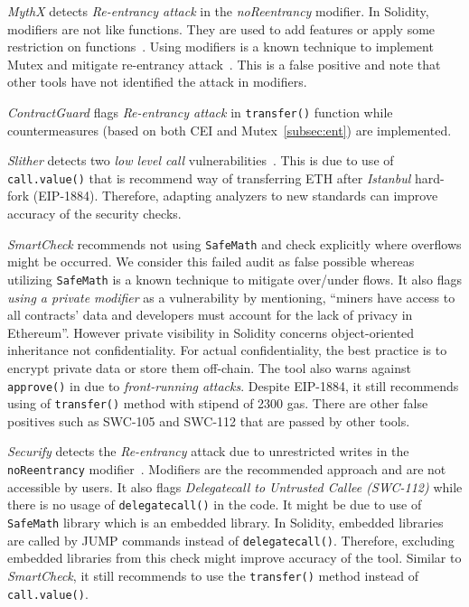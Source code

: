\textit{MythX} detects \textit{Re-entrancy attack} in the \textit{noReentrancy} modifier. In Solidity, modifiers are not like functions. They are used to add features or apply some restriction on functions~\cite{SolidityModifer}. Using modifiers is a known technique to implement Mutex and mitigate re-entrancy attack~\cite{ReentrancyGuard}. This is a false positive and note that other tools have not identified the attack in modifiers.

\textit{ContractGuard} flags \textit{Re-entrancy attack} in \texttt{transfer()} function while countermeasures (based on both CEI and Mutex~\ref{subsec:ent}) are implemented.

\textit{Slither} detects two \textit{low level call} vulnerabilities~\cite{SlitherSetup}. This is due to use of \texttt{call.value()} that is recommend way of transferring ETH after \textit{Istanbul} hard-fork (EIP-1884).	Therefore, adapting analyzers to new standards can improve accuracy of the security checks.

\textit{SmartCheck} recommends not using \texttt{SafeMath} and check explicitly where overflows might be occurred. We consider this failed audit as false possible whereas utilizing \texttt{SafeMath} is a known technique to mitigate over/under flows. It also flags \textit{using a private modifier} as a vulnerability by mentioning, ``miners have access to all contracts' data and developers must account for the lack of privacy in Ethereum''. However private visibility in Solidity concerns object-oriented inheritance not confidentiality. For actual confidentiality, the best practice is to encrypt private data or store them off-chain. The tool also warns against \texttt{approve()} in \erc due to \textit{front-running attacks}. Despite EIP-1884, it still recommends using of \texttt{transfer()} method with stipend of 2300 gas. There are other false positives such as SWC-105 and SWC-112 that are passed by other tools.

\textit{Securify} detects the \textit{Re-entrancy} attack due to unrestricted writes in the \texttt{noReentrancy} modifier~\cite{SECURIFY}. Modifiers are the recommended approach and are not accessible by users. It also flags \textit{Delegatecall to Untrusted Callee (SWC-112)} while there is no usage of \texttt{delegatecall()} in the code. It might be due to use of \texttt{SafeMath} library which is an embedded library. In Solidity, embedded libraries are called by JUMP commands instead of \texttt{delegatecall()}. Therefore, excluding embedded libraries from this check might improve accuracy of the tool. Similar to \textit{SmartCheck}, it still recommends to use the \texttt{transfer()} method instead of \texttt{call.value()}.

